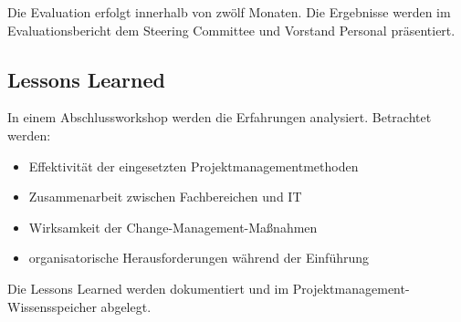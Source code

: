 Die Evaluation erfolgt innerhalb von zwölf Monaten. Die Ergebnisse werden im Evaluationsbericht dem Steering Committee und Vorstand Personal präsentiert.

\subsection{Lessons Learned}

In einem Abschlussworkshop werden die Erfahrungen analysiert. Betrachtet werden:

\begin{itemize}

    \item Effektivität der eingesetzten Projektmanagementmethoden

    \item Zusammenarbeit zwischen Fachbereichen und \ac{IT}

    \item Wirksamkeit der Change-Management-Maßnahmen

    \item organisatorische Herausforderungen während der Einführung

\end{itemize}

Die Lessons Learned werden dokumentiert und im Projektmanagement-Wissensspeicher abgelegt.